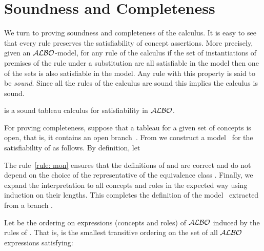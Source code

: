 \documentclass[leqno
,pdflatex
,prodmode
,acmtocl
]{acmsmall}
\newcommand{\mathcmd}[1]{\ensuremath{#1}\xspace}
\newcommand{\dlfont}{\mathcal}
\newcommand{\dl}[1]{\mathcmd{\dlfont{#1}}}
\newcommand{\ALBOid}{\dl{ALBO\smash[t]{\mbox{}}}}
\begin{document}
\section{Soundness and Completeness}
\label{section: Soundness and completeness}

We turn to proving soundness and completeness of the calculus.
It is easy to see that every rule preserves the satisfiability of concept assertions.
More precisely, given an \ALBOid-model, for any rule 
of the calculus  
if the set  of instantiations of premises of the rule  
under a substitution 
are all satisfiable in the model then 
one of the sets  is also satisfiable in the model.  
Any rule with this property is said to be \emph{sound}.
Since all the rules of the calculus are sound this implies the calculus
 is sound.
\begin{theorem}[Soundness]
 is a sound tableau calculus for satisfiability in
\ALBOid.
\end{theorem}

For proving completeness, suppose that a tableau  for
a given set of concepts 
is open, that is, 
it contains an open branch~.
From  we construct a model~ for the satisfiability of 
as follows.
By definition, let

The rule~\eqref{rule: mon}
ensures that
the definitions of  and  are correct and 
do not depend on the choice of the representative  of the equivalence
class . 
Finally, we expand the interpretation  to all concepts and roles in the expected way
using induction on their lengths.
This completes the definition of the model~ extracted from a branch .

Let  be the ordering on expressions (concepts and roles) of \ALBOid induced by the rules of .
That is,  is the smallest transitive ordering
on the set of all \ALBOid expressions 
satisfying:
\end{document}
